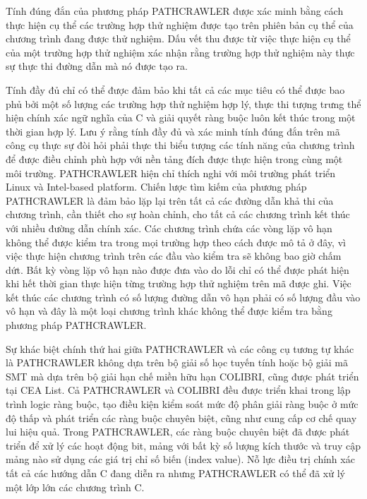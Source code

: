 \documentclass[12pt,a4paper]{report}
\begin{document}
\indent Tính đúng đắn của phương pháp PATHCRAWLER được xác minh bằng cách thực hiện cụ thể các trường hợp thử nghiệm được tạo trên phiên bản cụ thể của chương trình đang được thử nghiệm. Dấu vết thu được từ việc thực hiện cụ thể của một trường hợp thử nghiệm xác nhận rằng trường hợp thử nghiệm này thực sự thực thi đường dẫn mà nó được tạo ra.

\indent Tính đầy đủ chỉ có thể được đảm bảo khi tất cả các mục tiêu có thể được bao phủ bởi một số lượng các trường hợp thử nghiệm hợp lý, thực thi tượng trưng thể hiện chính xác ngữ nghĩa của C và giải quyết ràng buộc luôn kết thúc trong một thời gian hợp lý. Lưu ý rằng tính đầy đủ và xác minh tính đúng đắn trên mã công cụ thực sự đòi hỏi phải thực thi biểu tượng các tính năng của chương trình để được điều chỉnh phù hợp với nền tảng đích được thực hiện trong cùng một môi trường. PATHCRAWLER hiện chỉ thích nghi với môi trường phát triển Linux và Intel-based platform. Chiến lược tìm kiếm của phương pháp PATHCRAWLER là đảm bảo lặp lại trên tất cả các đường dẫn khả thi của chương trình, cần thiết cho sự hoàn chỉnh, cho tất cả các chương trình kết thúc với nhiều đường dẫn chính xác. Các chương trình chứa các vòng lặp vô hạn không thể được kiểm tra trong mọi trường hợp theo cách được mô tả ở đây, vì việc thực hiện chương trình trên các đầu vào kiểm tra sẽ không bao giờ chấm dứt. Bất kỳ vòng lặp vô hạn nào được đưa vào do lỗi chỉ có thể được phát hiện khi hết thời gian thực hiện từng trường hợp thử nghiệm trên mã được ghi. Việc kết thúc các chương trình có số lượng đường dẫn vô hạn phải có số lượng đầu vào vô hạn và đây là một loại chương trình khác không thể được kiểm tra bằng phương pháp PATHCRAWLER.

\indent Sự khác biệt chính thứ hai giữa PATHCRAWLER và các công cụ tương tự khác là PATHCRAWLER không dựa trên bộ giải số học tuyến tính hoặc bộ giải mã SMT mà dựa trên bộ giải hạn chế miền hữu hạn COLIBRI, cũng được phát triển tại CEA List. Cả PATHCRAWLER và COLIBRI đều được triển khai trong lập trình logic ràng buộc, tạo điều kiện kiểm soát mức độ phân giải ràng buộc ở mức độ thấp và phát triển các ràng buộc chuyên biệt, cũng như cung cấp cơ chế quay lui hiệu quả.  Trong PATHCRAWLER, các ràng buộc chuyên biệt đã được phát triển để xử lý các hoạt động bit, mảng với bất kỳ số lượng kích thước và truy cập mảng nào sử dụng các giá trị chỉ số biến (index value). Nỗ lực điều trị chính xác tất cả các hướng dẫn C đang diễn ra nhưng PATHCRAWLER có thể đã xử lý một lớp lớn các chương trình C.
\end{document}
